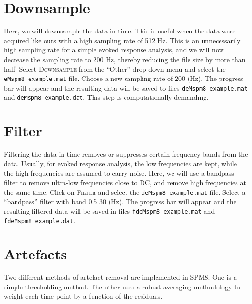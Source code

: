 \section{Downsample}
Here, we will downsample the data in time. This is useful when the data were acquired like ours with a high sampling rate of 512 Hz. This is an unnecessarily high sampling rate for a simple evoked response analysis, and we will now decrease the sampling rate to 200 Hz, thereby reducing the file size by more than half. Select \textsc{Downsample} from the ``Other'' drop-down menu and select the \texttt{eMspm8\_example.mat} file. Choose a new sampling rate of 200 (Hz). The progress bar will appear and the resulting data will be saved to files \texttt{deMspm8\_example.mat} and \texttt{deMspm8\_example.dat}. This step is computationally demanding.

\section{Filter}
Filtering the data in time removes or suppresses certain frequency bands from the data. Usually, for evoked response analysis, the low frequencies are kept, while the high frequencies are assumed to carry noise. Here, we will use a bandpass filter to remove ultra-low frequencies close to DC, and remove high frequencies at the same time. Click on \textsc{Filter} and select the \texttt{deMspm8\_example.mat} file. Select a ``bandpass'' filter with band 0.5 30 (Hz). The progress bar will appear and the resulting filtered data will be saved in files \texttt{fdeMspm8\_example.mat} and \texttt{fdeMspm8\_example.dat}.

\section{Artefacts}
Two different methods of artefact removal are implemented in SPM8. One is a simple thresholding method. The other uses a robust averaging methodology to weight each time point by a function of the residuals.

